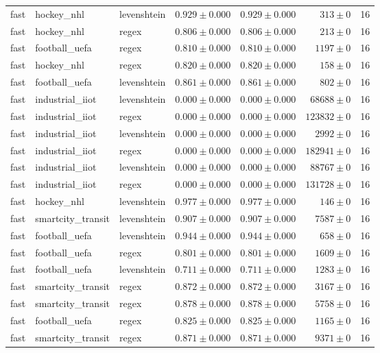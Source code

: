 \begin{table}[htbp]
\begin{tabular}{l l l r r r r}
fast & hockey\_nhl & levenshtein & $0.929\pm0.000$ & $0.929\pm0.000$ & $313\pm0$ & 16 \\
fast & hockey\_nhl & regex & $0.806\pm0.000$ & $0.806\pm0.000$ & $213\pm0$ & 16 \\
fast & football\_uefa & regex & $0.810\pm0.000$ & $0.810\pm0.000$ & $1197\pm0$ & 16 \\
fast & hockey\_nhl & regex & $0.820\pm0.000$ & $0.820\pm0.000$ & $158\pm0$ & 16 \\
fast & football\_uefa & levenshtein & $0.861\pm0.000$ & $0.861\pm0.000$ & $802\pm0$ & 16 \\
fast & industrial\_iiot & levenshtein & $0.000\pm0.000$ & $0.000\pm0.000$ & $68688\pm0$ & 16 \\
fast & industrial\_iiot & regex & $0.000\pm0.000$ & $0.000\pm0.000$ & $123832\pm0$ & 16 \\
fast & industrial\_iiot & levenshtein & $0.000\pm0.000$ & $0.000\pm0.000$ & $2992\pm0$ & 16 \\
fast & industrial\_iiot & regex & $0.000\pm0.000$ & $0.000\pm0.000$ & $182941\pm0$ & 16 \\
fast & industrial\_iiot & levenshtein & $0.000\pm0.000$ & $0.000\pm0.000$ & $88767\pm0$ & 16 \\
fast & industrial\_iiot & regex & $0.000\pm0.000$ & $0.000\pm0.000$ & $131728\pm0$ & 16 \\
fast & hockey\_nhl & levenshtein & $0.977\pm0.000$ & $0.977\pm0.000$ & $146\pm0$ & 16 \\
fast & smartcity\_transit & levenshtein & $0.907\pm0.000$ & $0.907\pm0.000$ & $7587\pm0$ & 16 \\
fast & football\_uefa & levenshtein & $0.944\pm0.000$ & $0.944\pm0.000$ & $658\pm0$ & 16 \\
fast & football\_uefa & regex & $0.801\pm0.000$ & $0.801\pm0.000$ & $1609\pm0$ & 16 \\
fast & football\_uefa & levenshtein & $0.711\pm0.000$ & $0.711\pm0.000$ & $1283\pm0$ & 16 \\
fast & smartcity\_transit & regex & $0.872\pm0.000$ & $0.872\pm0.000$ & $3167\pm0$ & 16 \\
fast & smartcity\_transit & regex & $0.878\pm0.000$ & $0.878\pm0.000$ & $5758\pm0$ & 16 \\
fast & football\_uefa & regex & $0.825\pm0.000$ & $0.825\pm0.000$ & $1165\pm0$ & 16 \\
fast & smartcity\_transit & regex & $0.871\pm0.000$ & $0.871\pm0.000$ & $9371\pm0$ & 16 \\

\end{tabular}
\end{table}
